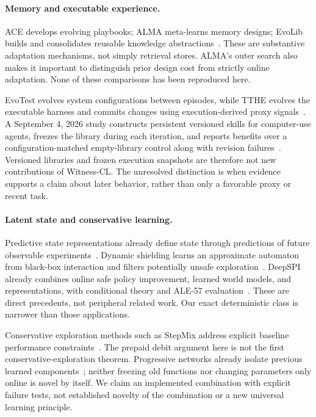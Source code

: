 \documentclass[10pt,twocolumn]{article}
\begin{document}
\paragraph{Memory and executable experience.}
ACE develops evolving playbooks; ALMA meta-learns memory designs; EvoLib builds
and consolidates reusable knowledge abstractions~\cite{ace,alma,evolib}. These are
substantive adaptation mechanisms, not simply retrieval stores. ALMA's outer
search also makes it important to distinguish prior design cost from strictly
online adaptation. None of these comparisons has been reproduced here.

EvoTest evolves system configurations between episodes, while TTHE evolves the
executable harness and commits changes using execution-derived proxy
signals~\cite{evotest,tthe}. A September 4, 2026 study constructs persistent
versioned skills for computer-use agents, freezes the library during each
iteration, and reports benefits over a configuration-matched empty-library
control along with revision failures~\cite{persistent}. Versioned libraries and
frozen execution snapshots are therefore not new contributions of Witness-CL.
The unresolved distinction is when evidence supports a claim about later
behavior, rather than only a favorable proxy or recent task.

\paragraph{Latent state and conservative learning.}
Predictive state representations already define state through predictions of
future observable experiments~\cite{psr}. Dynamic shielding learns an approximate
automaton from black-box interaction and filters potentially unsafe
exploration~\cite{dynamicshield}. DeepSPI already combines online safe policy
improvement, learned world models, and representations, with conditional theory
and ALE-57 evaluation~\cite{deepspi}. These are direct precedents, not peripheral
related work. Our exact deterministic class is narrower than those applications.

Conservative exploration methods such as StepMix address explicit baseline
performance constraints~\cite{stepmix}. The prepaid debit argument here is not
the first conservative-exploration theorem. Progressive networks already isolate
previous learned components~\cite{progressive}; neither freezing old functions
nor changing parameters only online is novel by itself. We claim an implemented
combination with explicit failure tests, not established novelty of the
combination or a new universal learning principle.
\end{document}
